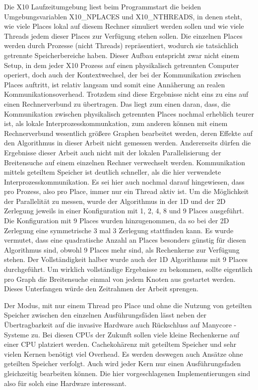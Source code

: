 Die X10 Laufzeitumgebung liest beim Programmstart die beiden Umgebungsvariablen X10\_NPLACES und X10\_NTHREADS, in denen steht, wie viele Places lokal auf diesem Rechner simuliert werden sollen und wie viele Threads jedem dieser Places zur Verfügung stehen sollen. Die einzelnen Places werden durch Prozesse (nicht Threads) repräsentiert, wodurch sie tatsächlich getrennte Speicherbereiche haben. Dieser Aufbau entspricht zwar nicht einem Setup, in dem jeder X10 Prozess auf einen physikalisch getrennten Computer operiert, doch auch der Kontextwechsel, der bei der Kommunikation zwischen Places auftritt, ist relativ langsam und somit eine Annäherung an realen Kommunikationsoverhead. Trotzdem sind diese Ergebnisse nicht eins zu eins auf einen Rechnerverbund zu übertragen. Das liegt zum einen daran, dass, die Kommunikation zwischen physikalisch getrennten Places nochmal erheblich teurer ist, als lokale Interprozesskommunkation, zum anderen können mit einem Rechnerverbund wesentlich größere Graphen bearbeitet werden, deren Effekte auf den Algorithmus in dieser Arbeit nicht gemessen werden.
Andererseits dürfen die Ergebnisse dieser Arbeit auch nicht mit der lokalen Parallelisierung der Breitensuche auf einem einzelnen Rechner verwechselt werden. Kommunikation mittels geteiltem Speicher ist deutlich schneller, als die hier verwendete Interprozesskommunikation. Es sei hier auch nochmal darauf hingewiesen, dass pro Prozess, also pro Place, immer nur ein Thread aktiv ist.
Um die Möglichkeit der Parallelität zu messen, wurde der Algorithmus in der 1D und der 2D Zerlegung jeweils in einer Konfiguration mit 1, 2, 4, 8 und 9 Places ausgeführt. Die Konfiguration mit 9 Places wurden hinzugenommen, da so bei der 2D Zerlegung eine symmetrische 3 mal 3 Zerlegung stattfinden kann. Es wurde vermutet, dass eine quadratische Anzahl an Places besonders günstig für diesen Algorithmus sind, obwohl 9 Places mehr sind, als Rechenkerne zur Verfügung stehen. Der Vollständigkeit halber wurde auch der 1D Algorithmus mit 9 Places durchgeführt. Um wirklich vollständige Ergebnisse zu bekommen, sollte eigentlich pro Graph die Breitensuche einmal von jedem Knoten aus gestartet werden.  Dieses Unterfangen würde den Zeitrahmen der Arbeit sprengen.

Der Modus, mit nur einem Thread pro Place und ohne die Nutzung von geteilten Speicher zwischen den einzelnen Ausführungsfäden lässt neben der Übertragbarkeit auf die invasive Hardware auch Rückschluss auf Manycore - Systeme zu. Bei diesen CPUs der Zukunft sollen viele kleine Rechenkerne auf einer CPU platziert werden. Cachekohärenz mit geteiltem Speicher und sehr vielen Kernen benötigt viel Overhead. Es werden deswegen auch Ansätze ohne geteilten Speicher verfolgt. Auch wird jeder Kern nur einen Ausführungsfaden gleichzeitig bearbeiten können. Die hier vorgeschlagenen Implementierungen sind also für solch eine Hardware interessant.

